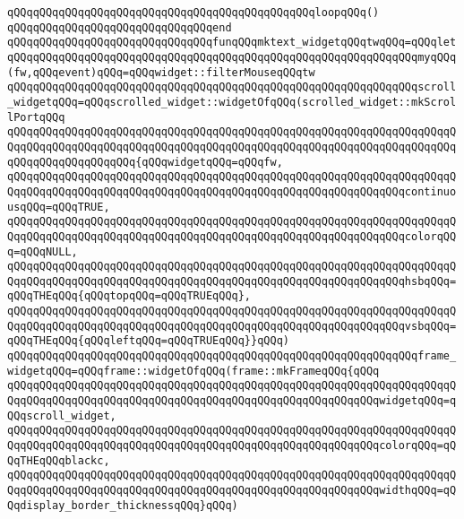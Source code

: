 \verb|qQQqqQQqqQQqqQQqqQQqqQQqqQQqqQQqqQQqqQQqqQQqqQQqloopqQQq()|\newline
\verb|qQQqqQQqqQQqqQQqqQQqqQQqqQQqqQQqend|\newline
\newline
\verb|qQQqqQQqqQQqqQQqqQQqqQQqqQQqqQQqfunqQQqmktext_widgetqQQqtwqQQq=qQQqlet|\newline
\verb|qQQqqQQqqQQqqQQqqQQqqQQqqQQqqQQqqQQqqQQqqQQqqQQqqQQqqQQqqQQqqQQqmyqQQq(fw,qQQqevent)qQQq=qQQqwidget::filterMouseqQQqtw|\newline
\newline
\verb|qQQqqQQqqQQqqQQqqQQqqQQqqQQqqQQqqQQqqQQqqQQqqQQqqQQqqQQqqQQqqQQqscroll_widgetqQQq=qQQqscrolled_widget::widgetOfqQQq(scrolled_widget::mkScrollPortqQQq|\newline
\verb|qQQqqQQqqQQqqQQqqQQqqQQqqQQqqQQqqQQqqQQqqQQqqQQqqQQqqQQqqQQqqQQqqQQqqQQqqQQqqQQqqQQqqQQqqQQqqQQqqQQqqQQqqQQqqQQqqQQqqQQqqQQqqQQqqQQqqQQqqQQqqQQqqQQqqQQqqQQqqQQq{qQQqwidgetqQQq=qQQqfw,|\newline
\verb|qQQqqQQqqQQqqQQqqQQqqQQqqQQqqQQqqQQqqQQqqQQqqQQqqQQqqQQqqQQqqQQqqQQqqQQqqQQqqQQqqQQqqQQqqQQqqQQqqQQqqQQqqQQqqQQqqQQqqQQqqQQqqQQqqQQqcontinuousqQQq=qQQqTRUE,|\newline
\verb|qQQqqQQqqQQqqQQqqQQqqQQqqQQqqQQqqQQqqQQqqQQqqQQqqQQqqQQqqQQqqQQqqQQqqQQqqQQqqQQqqQQqqQQqqQQqqQQqqQQqqQQqqQQqqQQqqQQqqQQqqQQqqQQqqQQqcolorqQQq=qQQqNULL,|\newline
\verb|qQQqqQQqqQQqqQQqqQQqqQQqqQQqqQQqqQQqqQQqqQQqqQQqqQQqqQQqqQQqqQQqqQQqqQQqqQQqqQQqqQQqqQQqqQQqqQQqqQQqqQQqqQQqqQQqqQQqqQQqqQQqqQQqqQQqhsbqQQq=qQQqTHEqQQq{qQQqtopqQQq=qQQqTRUEqQQq},|\newline
\verb|qQQqqQQqqQQqqQQqqQQqqQQqqQQqqQQqqQQqqQQqqQQqqQQqqQQqqQQqqQQqqQQqqQQqqQQqqQQqqQQqqQQqqQQqqQQqqQQqqQQqqQQqqQQqqQQqqQQqqQQqqQQqqQQqqQQqvsbqQQq=qQQqTHEqQQq{qQQqleftqQQq=qQQqTRUEqQQq}}qQQq)|\newline
\verb|qQQqqQQqqQQqqQQqqQQqqQQqqQQqqQQqqQQqqQQqqQQqqQQqqQQqqQQqqQQqqQQqframe_widgetqQQq=qQQqframe::widgetOfqQQq(frame::mkFrameqQQq{qQQq|\newline
\verb|qQQqqQQqqQQqqQQqqQQqqQQqqQQqqQQqqQQqqQQqqQQqqQQqqQQqqQQqqQQqqQQqqQQqqQQqqQQqqQQqqQQqqQQqqQQqqQQqqQQqqQQqqQQqqQQqqQQqqQQqqQQqqQQqwidgetqQQq=qQQqscroll_widget,|\newline
\verb|qQQqqQQqqQQqqQQqqQQqqQQqqQQqqQQqqQQqqQQqqQQqqQQqqQQqqQQqqQQqqQQqqQQqqQQqqQQqqQQqqQQqqQQqqQQqqQQqqQQqqQQqqQQqqQQqqQQqqQQqqQQqqQQqcolorqQQq=qQQqTHEqQQqblackc,|\newline
\verb|qQQqqQQqqQQqqQQqqQQqqQQqqQQqqQQqqQQqqQQqqQQqqQQqqQQqqQQqqQQqqQQqqQQqqQQqqQQqqQQqqQQqqQQqqQQqqQQqqQQqqQQqqQQqqQQqqQQqqQQqqQQqqQQqwidthqQQq=qQQqdisplay_border_thicknessqQQq}qQQq)|\newline
